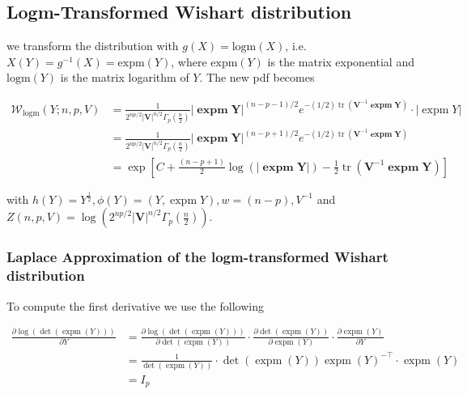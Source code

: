 \subsection{Logm-Transformed Wishart distribution}

we transform the distribution with $g(X) = \text{logm}(X)$, i.e. $X(Y) = g^{-1}(X) = \text{expm}(Y)$, where $\text{expm}(Y)$ is the matrix exponential and $\text{logm}(Y)$ is the matrix logarithm of $Y$. The new pdf becomes

\begin{subequations}
\begin{align}
\mathcal{W}_{\text{logm}}(Y; n, p, V) &= \frac{1}{2^{np/2} \left|{\mathbf V}\right|^{n/2} \Gamma_p\left(\frac {n}{2}\right ) }{\left|\mathbf{\operatorname{expm}Y}\right|}^{(n-p-1)/2} e^{-(1/2)\operatorname{tr}({\mathbf V}^{-1}\mathbf{\operatorname{expm}Y})} \cdot |\operatorname{expm}Y| \\ 
&= \frac{1}{2^{np/2} \left|{\mathbf V}\right|^{n/2} \Gamma_p\left(\frac {n}{2}\right ) }{\left|\mathbf{\operatorname{expm}Y}\right|}^{(n-p+1)/2} e^{-(1/2)\operatorname{tr}({\mathbf V}^{-1}\mathbf{\operatorname{expm}Y})} \\ 
&= \exp \left[C + \frac{(n-p+1)}{2} \log(\left|\mathbf{\operatorname{expm}Y}\right|)  - \frac{1}{2}\operatorname{tr}({\mathbf V}^{-1}\mathbf{\operatorname{expm}Y}) \right]
\end{align}
\end{subequations}

with $h(Y) = Y^{\frac{1}{2}}, \phi(Y) = (Y, \operatorname{expm}Y), w = (n-p), V^{-1}$ and $Z(n,p,V)=\log\left(2^{np/2} \left|{\mathbf V}\right|^{n/2} \Gamma_p\left(\frac {n}{2}\right )\right)$.

\subsubsection{Laplace Approximation of the logm-transformed Wishart distribution}

To compute the first derivative we use the following

\begin{align}
	\frac{\partial \log(\det(\operatorname{expm}(Y)))}{\partial Y} 
	&= \frac{\partial \log(\det(\operatorname{expm}(Y)))}{\partial \det(\operatorname{expm}(Y))} \cdot \frac{\partial \det(\operatorname{expm}(Y))}{\partial \operatorname{expm}(Y)} \cdot \frac{\partial \operatorname{expm}(Y)}{\partial Y} \\
	&= \frac{1}{\det(\operatorname{expm}(Y))} \cdot \det(\operatorname{expm}(Y)) \operatorname{expm}(Y)^{-\top} \cdot \operatorname{expm}(Y) \\
	&= I_p
\end{align}

